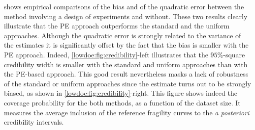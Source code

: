  shows empirical comparisons of the bias and of the quadratic error between the method involving a design of experiments and without. These two results clearly illustrate that the PE approach outperforms the standard {and the uniform} approaches. Although the quadratic error is strongly related to the variance of the estimates it is significantly offset by the fact that the bias is smaller with the PE approach. Indeed, \cref{lowdoe:fig:credibility}-left illustrates that the $95\%$-square credibility width is smaller with the standard {and uniform} approaches than with the PE-based approach. This good result nevertheless masks a lack of robustness of the standard {or uniform}  approaches since the estimate turns out to be strongly biased, as shown in \cref{lowdoe:fig:credibility}-right. This figure shows indeed the coverage probability for the both methods, as a function of the dataset size. It measures the average inclusion of the reference fragility curves to the \emph{a posteriori} credibility intervals.





